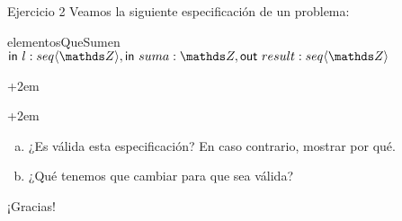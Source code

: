\documentclass{beamer}
\begin{document}
\begin{frame}{Ejercicio 2}
Veamos la siguiente especificación de un problema:
\begin{proc}{elementosQueSumen}{\\
    \qquad$\In l: \TLista{\ent}, \In suma: \ent, \Out result: \TLista{\ent}$\\
}{}{}
    \begin{adjustwidth}{+2em}{}   
    \end{adjustwidth}
    \begin{adjustwidth}{+2em}{}
    \end{adjustwidth}
\end{proc}

\pause

\begin{enumerate}[a)]
    \item ¿Es válida esta especificación? En caso contrario, mostrar por qué.\pause
    \item ¿Qué tenemos que cambiar para que sea válida?
\end{enumerate}

\end{frame}

\begin{frame}
    \center\huge
    ¡Gracias!
\end{frame}
\end{document}
